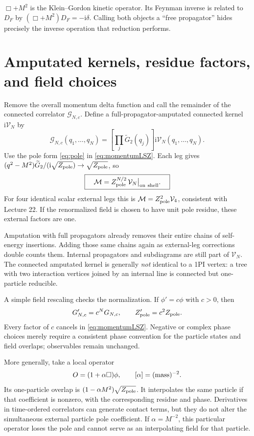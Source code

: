 \documentclass[11pt]{article}
\newcommand{\ii}{\mathrm i}
\newcommand{\module}[1]{\clearpage\section{#1}}
\newcommand{\cM}{\mathcal M}
\newcommand{\Zp}{Z_{\rm pole}}
\begin{document}
\begin{remarkbox}
\(\Box+M^2\) is the Klein--Gordon kinetic operator. Its Feynman inverse is
related to \(D_F\) by \((\Box+M^2)D_F=-\ii\delta\).
Calling both objects a ``free propagator'' hides precisely the inverse
operation that reduction performs.
\end{remarkbox}

\module{Amputated kernels, residue factors, and field choices}
Remove the overall momentum delta function and call the remainder of the
connected correlator \(\mathcal G_{N,c}\). Define a full-propagator-amputated
connected kernel \(\ii\mathcal V_N\) by
\begin{equation}
 \mathcal G_{N,c}(q_1,\ldots,q_N)
 =\left[\prod_j\widetilde G_2(q_j)\right]\ii\mathcal V_N(q_1,\ldots,q_N).
\end{equation}
Use the pole form \eqref{eq:pole} in \eqref{eq:momentumLSZ}. Each leg gives
\((q^2-M^2)\widetilde G_2/(\ii\sqrt{\Zp})\to\sqrt{\Zp}\), so
\begin{equation}
 \boxed{\quad\cM=\Zp^{N/2}\,\mathcal V_N\big|_{\rm on\ shell}.\quad}
 \label{eq:kernelLSZ}
\end{equation}
For four identical scalar external legs this is \(\cM=\Zp^2\mathcal V_4\),
consistent with Lecture 22. If the renormalized field is chosen to have
unit pole residue, these external factors are one.

Amputation with full propagators already removes their entire chains of
self-energy insertions. Adding those same chains again as external-leg
corrections double counts them. Internal propagators and subdiagrams are
still part of \(\mathcal V_N\). The connected amputated kernel is generally
\emph{not} identical to a 1PI vertex: a tree with two interaction vertices
joined by an internal line is connected but one-particle reducible.

A simple field rescaling checks the normalization. If \(\phi'=c\phi\)
with \(c>0\), then
\begin{equation}
 G'_{N,c}=c^NG_{N,c},\qquad Z'_{\rm pole}=c^2\Zp.
\end{equation}
Every factor of \(c\) cancels in \eqref{eq:momentumLSZ}. Negative or complex
phase choices merely require a consistent phase convention for the
particle states and field overlaps; observables remain unchanged.

More generally, take a local operator
\begin{equation}
 O=(1+\alpha\Box)\phi,\qquad [\alpha]=({\rm mass})^{-2}.
\end{equation}
Its one-particle overlap is \((1-\alpha M^2)\sqrt{\Zp}\). It interpolates
the same particle if that coefficient is nonzero, with the corresponding
residue and phase. Derivatives in time-ordered correlators can generate
contact terms, but they do not alter the simultaneous external particle
pole coefficient. If \(\alpha=M^{-2}\), this particular operator loses the
pole and cannot serve as an interpolating field for that particle.
\end{document}
